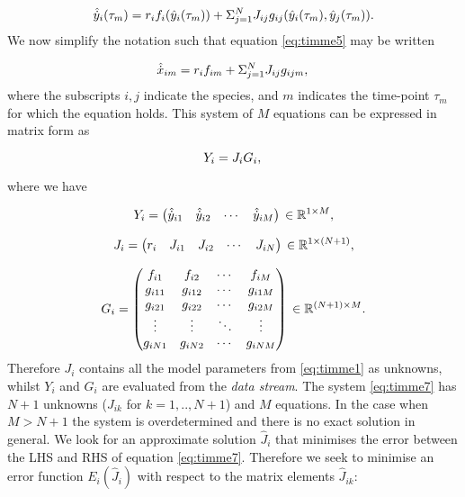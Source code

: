 \begin{equation}\label{eq:timme5}
\hat{\dot{y}}_{i}(\tau_m) = r_if_{i}(\hat{y}_i(\tau_m)) + \Sigma_{j=1}^{N}J_{ij}g_{ij}(\hat{y}_i(\tau_m), \hat{y}_j(\tau_m)).\\
\end{equation}
%
We now simplify the notation such that equation \eqref{eq:timme5} may be written 

\begin{equation}\label{eq:timme6}
\hat{\dot{x}}_{im} = r_if_{im} + \Sigma_{j=1}^{N}J_{ij}g_{ijm},\\
\end{equation}
%
where the subscripts  $i,j$ indicate the species, and $m$ indicates the time-point $\tau_m$ for which the equation holds. This system of $M$ equations can be expressed in matrix form as

\begin{equation}\label{eq:timme7}
Y_{i} = J_iG_i,\\
\end{equation}

where we have

\begin{equation}\label{eq:timme8}
Y_{i} = 
\begin{pmatrix}
  \hat{\dot{y}}_{i1} & \hat{\dot{y}}_{i2} & \cdots & \hat{\dot{y}}_{iM}
\end{pmatrix}\\
\in{\mathbb{R}^{1 \times M}},
\end{equation}

\begin{equation}\label{eq:timme9}
J_{i} = 
\begin{pmatrix}
  r_i & J_{i1} & J_{i2} & \cdots & J_{iN}
\end{pmatrix}\\
\in{\mathbb{R}^{1 \times(N+1)}},
\end{equation}

\begin{equation}\label{eq:timme10}
G_{i} = 
\begin{pmatrix}
  f_{i1}  &    f_{i2} & \cdots & f_{iM}         \\
  g_{i11} & g_{i12} & \cdots & g_{i1M} \\
  g_{i21} & g_{i22} & \cdots & g_{i2M} \\
  \vdots    & \vdots    & \ddots & \vdots    \\
  g_{iN1} & g_{iN2} & \cdots & g_{iNM} \\
\end{pmatrix}\\
\in{\mathbb{R}^{(N+1)\times M}}.
\end{equation}
%
Therefore $J_i$ contains all the model parameters from \eqref{eq:timme1} as unknowns, whilst $Y_i$ and $G_i$ are evaluated from the \emph{data stream}. The system \ref{eq:timme7} has $N+1$ unknowns ($J_{ik}$ for $k=1,..,N+1$) and $M$ equations. In the case when $M>N+1$ the system is overdetermined and there is no exact solution in general. We look for an approximate solution $\hat{J}_i$ that minimises the error between the LHS and RHS of equation \ref{eq:timme7}. Therefore we seek to minimise an error function $E_i(\hat{J}_i)$ with respect to the matrix elements $\hat{J}_{ik}$:

